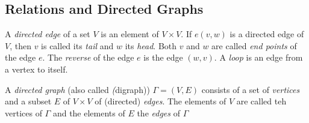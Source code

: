 \subsection{Relations and Directed Graphs}

\begin{definition}
    A \emph{directed edge} of a set $V$ is an element of $V\times V$. If $ e (v,w) $ is a directed edge of $V$, then
    $v$ is called its \emph{tail} and $w$ its \emph{head}. Both $v$ and $w$ are called \emph{end points} of the edge $e$.
    The \emph{reverse} of the edge $e$ is the edge $ (w,v) $. A \emph{loop} is an edge from a vertex to itself. \par
A \emph{directed graph} (also called \emph(digraph)) $\Gamma = (V,E)$ consists of a set of \emph{vertices} and a subset $E$ of $V\times V$ of (directed) \emph{edges}.
The elements of $V$ are called teh vertices of $\Gamma$ and the elements of $E$ the \emph{edges} of $\Gamma$
\end{definition}

